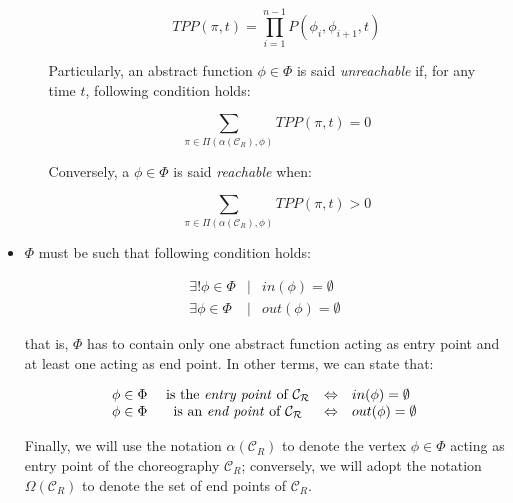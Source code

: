 \documentclass[12pt,a4paper]{report}
\begin{document}
\begin{itemize}
\begin{itemize}
		\begin{equation}
			TPP(\pi, t) = \prod_{i = 1}^{n-1} P\left(\phi_i, \phi_{i+1}, t \right)
		\end{equation}
	
		Particularly, an abstract function $\phi \in \Phi$ is said \textit{unreachable} if, for any time $t$, following condition holds:
	
		\begin{equation}\label{cond3}
			\displaystyle \sum_{\pi \in \Pi(\alpha(\mathcal{C}_R), \phi)} TPP(\pi, t) = 0
		\end{equation}
	
		Conversely, a $\phi \in \Phi$ is said \textit{reachable} when:

		\begin{equation}\label{cond3}
			\displaystyle \sum_{\pi \in \Pi(\alpha(\mathcal{C}_R), \phi)} TPP(\pi, t) > 0
		\end{equation}
		
	\end{itemize}

	\item $\Phi$ must be such that following condition holds:
	
	\begin{eqnarray}
		\exists !  \phi \in \Phi &\mid & in(\phi) = \emptyset \label{cond1} \\
		\exists  \phi \in \Phi & \mid & out(\phi) = \emptyset \label{cond2}
	\end{eqnarray}
	
	that is, $\Phi$ has to contain only one abstract function acting as entry point and at least one acting as end point.	In other terms, we can state that:
	
	\begin{equation}
		\begin{array}{lcll}
			\phi \in \Phi & \text{ is the \textit{entry point} of } \mathcal{C_R} & \Leftrightarrow & in(\phi) = \emptyset \\
			\phi \in \Phi & \text{ is an \textit{end point} of } \mathcal{C_R} & \Leftrightarrow & out(\phi) = \emptyset
		\end{array}
	\end{equation}
	
	Finally, we will use the notation $\alpha(\mathcal{C}_R)$ to denote the vertex $\phi \in \Phi$ acting as entry point of the choreography $\mathcal{C}_R$; conversely, we will adopt the notation $\Omega(\mathcal{C}_R)$ to denote the set of end points of $\mathcal{C}_R$. 
		

\end{itemize}
\end{document}
